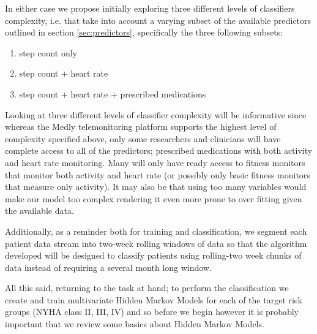 \documentclass[]{article}
\begin{document}
In either case we propose initially exploring three different levels of classifiers complexity, i.e. that take into account a varying subset of the available predictors outlined in section \ref{sec:predictors}, specifically the three following subsets:
\begin{enumerate}
	\item step count only
	\item step count + heart rate
	\item step count + heart rate + prescribed medications
\end{enumerate}
Looking at three different levels of classifier complexity will be informative since whereas the Medly telemonitoring platform supports the highest level of complexity specified above, only some researchers and clinicians will have complete access to all of the predictors; prescribed medications with both activity and heart rate monitoring. Many will only have ready access to fitness monitors that monitor both activity and heart rate (or possibly only basic fitness monitors that measure only activity). It may also be that using too many variables would make our model too complex rendering it even more prone to over fitting given the available data.


Additionally, as a reminder both for training and classification, we segment each patient data stream into two-week rolling windows of data so that the algorithm developed will be designed to classify patients using rolling-two week chunks of data instead of requiring a several month long window.

All this said, returning to the task at hand; to perform the classification we create and train multivariate Hidden Markov Models for each of the target risk groups (NYHA class II, III, IV) and so before we begin however it is probably important that we review some basics about Hidden Markov Models.
\end{document}
